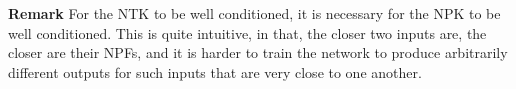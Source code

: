 \textbf{Remark} For the NTK to be well conditioned, it is necessary for the NPK to be well conditioned. This is quite intuitive, in that, the closer two inputs are, the closer are their NPFs, and it is harder to train the network to produce arbitrarily different outputs for such inputs that are very close to one another.
\begin{comment}
We can further simplify (i.e., without using switching instances) the dynamics of GD by using a `soft-ReLU' gate $\gamma_{sr}(q)=\frac{1}{\left(1+\exp(-\beta \cdot q)\right)}, \beta>0$, whose derivative its pre-activation is given by $\partial_{q}\gamma_{sr}(q)=\frac{\beta}{\left(1+\exp(\beta\cdot q)\right)\left(1+\exp(-\beta\cdot q)\right)}$. 
\begin{proposition}\label{prop:dnnsoft} For an infinitesimally small step-size of GD, the error dynamics  of a DNN with soft-ReLU gates is given by:
\FloatBarrier
\begin{table}[h]
\centering
\begin{tabular}{| l | lll |}\hline
Weights  & $\dot{\Theta}_t$&$=$&$-\sum_{s=1}^n \psi_{x_s,\Theta_t}e_t(s)=\sum_{s=1}^n (\psiv_{x_s,\Theta_t}+\psif_{x_s,\Theta_t})e_t(s)$\\
NPF & $\dot{\phi}_{x_s,\Theta_t}(p)$&$=$&$x(\I_0(p))\sum_{\theta\in\Theta}\partial_{\theta}A_{\Theta_t}(x_s,p)\dot{\theta}_t,\forall p\in[P], s\in[n]$\\
NPV & $\dot{v}_{\Theta_t}(p)$&$=$&$\sum_{\theta\in\Theta}\partial_{\theta}v_{\Theta_t}(p)\dot{\theta}_t,\forall p\in[P]$\\
Error & $\dot{e}_t$&$=$&$-K_{\Theta_t}e_t$, where $K_{\Theta}=\kv+\kf+\kc$\ \\\hline
\end{tabular}
\end{table}
\end{proposition}
\textbf{Remark:} Thanks to the soft-ReLU trick, we are able to capture the NPF learning via $\dot{\phi}_{x_s,\Theta_t}$ term.
\end{comment}